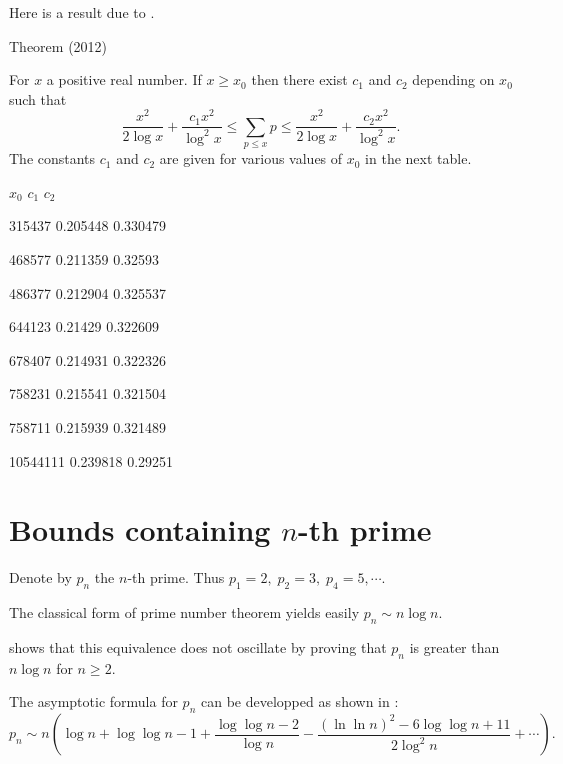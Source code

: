 \par 
  \par 
Here is a result due to 
\cite{Trevino*12}.
\par 
\begin{thm}{Theorem (2012)}

For $x$ a positive real number. If $x \geq x_0$ then there exist $c_1$
and $c_2$ depending on $x_0$ such that
$$
\frac{x^2}{2\log{x}} +
\frac{c_1 x^2}{\log^2{x}} \leq \sum_{p \leq x} p \leq
\frac{x^2}{2\log{x}} + \frac{c_2 x^2}{\log^2{x}}.
$$
The constants
$c_1$ and $c_2$ are given for various values of $x_0$ in the next
table.

  
  
    
      $x_0$
      $c_1$
      $c_2$
    
  
  
    315437
    0.205448
    0.330479
  
  
    468577
    0.211359
    0.32593
  
  
    486377
    0.212904
    0.325537
  
  
    644123
    0.21429
    0.322609
  
  
    678407
    0.214931
    0.322326
  
  
    758231
    0.215541
    0.321504
  
  
    758711
    0.215939
    0.321489
  
  
    10544111
    0.239818
    0.29251
  
  

\end{thm}

\par 


\section{Bounds containing $n$-th prime}



Denote by $p_n$  the $n$-th prime. Thus $p_1=2,\;p_2=3,\; p_4=5,\cdots$.

The classical form of prime number theorem yields easily
$p_n \sim n \log n.$ 

\cite{Rosser*38}
shows that this equivalence does not oscillate
by proving that $p_n$ is greater than $n\log n$ for $n\geq 2$.  


The asymptotic formula for $p_n$ can be developped as shown in
\cite{Cipolla*02}:
$$
p_n\sim n\left(\log n+\log\log n -1+\frac{\log\log n-2}{\log n}
-\frac{(\ln\ln n)^2-6\log\log n +11}{2\log^2 n}+\cdots\right).
$$


